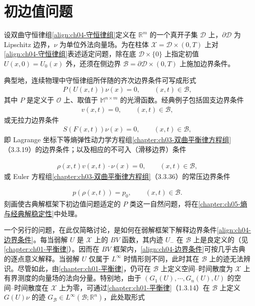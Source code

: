 \documentclass[../../main.tex]{subfiles}
\begin{document}
\section{初边值问题}\label{section:ch04-初边值问题}

设双曲守恒律组\eqref{align:ch04-守恒律组}定义在 $\mathbb{R}^{m}$ 的一个真开子集 $\mathscr{D}$ 上，$\partial\mathscr{D}$ 为 Lipschitz 边界，$\nu$ 为单位外法向量场。为在柱体 $\mathscr{X}=\mathscr{D}\times(0,T)$ 上对\eqref{align:ch04-守恒律组}表述适定问题，除在底 $\mathscr{D}\times\{0\}$ 上指定初值 $U(x,0)=U_{0}(x)$ 外，还须在侧边界 $\mathscr{B}=\partial\mathscr{D}\times(0,T)$ 上施加边界条件。

典型地，连续物理中守恒律组所伴随的齐次边界条件可写成形式
\begin{align}
P(U(x,t))\nu(x)=0,\qquad (x,t)\in\mathscr{B},
\label{align:ch04-边界条件}
\end{align}
其中 $P$ 是定义于 $\mathcal{O}$ 上、取值于 $\mathbb{M}^{n\times m}$ 的光滑函数。经典例子包括固支边界条件
\begin{align}
v(x,t)=0,\qquad (x,t)\in\mathscr{B},
\label{align:ch04-固支}
\end{align}
或无拉力边界条件
\begin{align}
S(F(x,t))\nu(x)=0,\qquad (x,t)\in\mathscr{B},
\label{align:ch04-无拉力}
\end{align}
即 Lagrange 坐标下等熵弹性动力学方程组\cref{chapter:ch03-双曲平衡律方程组}（3.3.19）的边界条件；以及相应的不可入（滑移边界）条件

\begin{align}
\rho(x,t)v(x,t)\cdot\nu(x)=0,\qquad (x,t)\in\mathscr{B},
\label{align:ch04-滑移}
\end{align}
或 Euler 方程组\cref{chapter:ch03-双曲平衡律方程组}（3.3.36）的常压边界条件

\begin{align}
p(\rho(x,t))=p_{0},\qquad (x,t)\in\mathscr{B}.
\label{align:ch04-常压}
\end{align}
刻画使古典解框架下初边值问题适定的 $P$ 类这一自然问题，将在\cref{chapter:ch05-熵与经典解稳定性}中处理。


一个另行的问题，在此仅简略讨论，是如何在弱解框架下解释边界条件\eqref{align:ch04-边界条件}。每当弱解 $U$ 是 $\mathscr{X}$ 上的 $BV$ 函数，其内迹 $U_{-}$ 在 $\mathscr{B}$ 上是良定义的（见\cref{chapter:ch01-平衡律}）。因而在 $BV$ 框架内，\eqref{align:ch04-边界条件}可按几乎古典的逐点意义解释。当弱解 $U$ 仅属于 $L^{\infty}$ 时情形则不同，此时其在 $\mathscr{B}$ 上的迹无法辨识。尽管如此，由\cref{chapter:ch01-平衡律}，仍可在 $\mathscr{B}$ 上定义空间--时间散度为 $\mathscr{X}$ 上有界测度的向量场的法向分量。特别地，由于 $(G_{1}(U),\cdots,G_{n}(U),U)$ 的空间--时间散度在 $\mathscr{X}$ 上为零，可通过\cref{chapter:ch01-平衡律}（1.3.14）在 $\mathscr{B}$ 上定义 $G(U)\nu$ 的迹 $G_{\mathscr{B}}\in L^{\infty}(\mathscr{B};\mathbb{R}^{n})$，此处取形式
\end{document}
